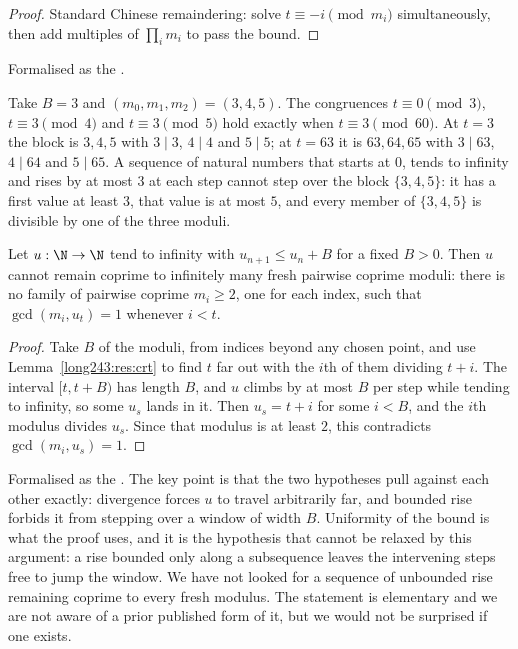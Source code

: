 \begin{proof}
Standard Chinese remaindering: solve $t\equiv-i \pmod{m_i}$ simultaneously,
then add multiples of $\prod_i m_i$ to pass the bound.
\end{proof}

\noindent Formalised as the
.

\begin{example}\label{long243:ex:crt}
Take $B=3$ and $(m_0,m_1,m_2)=(3,4,5)$.  The congruences $t\equiv0\pmod3$,
$t\equiv3\pmod4$ and $t\equiv3\pmod5$ hold exactly when $t\equiv3\pmod{60}$.
At $t=3$ the block is $3,4,5$ with $3\mid3$, $4\mid4$ and $5\mid5$; at $t=63$
it is $63,64,65$ with $3\mid63$, $4\mid64$ and $5\mid65$.  A sequence of
natural numbers that starts at $0$, tends to infinity and rises by at most $3$
at each step cannot step over the block $\{3,4,5\}$: it has a first value at
least $3$, that value is at most $5$, and every member of $\{3,4,5\}$ is
divisible by one of the three moduli.
\end{example}

\begin{theorem}\label{long243:res:barrier}
Let $u:\N\to\N$ tend to infinity with $u_{n+1}\le u_n+B$ for a fixed $B>0$.
Then $u$ cannot remain coprime to infinitely many fresh pairwise coprime
moduli: there is no family of pairwise coprime $m_i\ge2$, one for each index,
such that $\gcd(m_i,u_t)=1$ whenever $i<t$.
\end{theorem}

\begin{proof}
Take $B$ of the moduli, from indices beyond any chosen point, and use
Lemma~\ref{long243:res:crt} to find $t$ far out with the $i$th of them dividing $t+i$.
The interval $[t,t+B)$ has length $B$, and $u$ climbs by at most $B$ per step
while tending to infinity, so some $u_s$ lands in it.  Then $u_s=t+i$ for some
$i<B$, and the $i$th modulus divides $u_s$.  Since that modulus is at least
$2$, this contradicts $\gcd(m_i,u_s)=1$.
\end{proof}

\noindent Formalised as the
.  The key point is that the two hypotheses pull against each other
exactly: divergence forces $u$ to travel arbitrarily far, and bounded rise
forbids it from stepping over a window of width $B$.  Uniformity of the bound
is what the proof uses, and it is the hypothesis that cannot be relaxed by this
argument: a rise bounded only along a subsequence leaves the intervening steps
free to jump the window.  We have not looked for a sequence of unbounded rise
remaining coprime to every fresh modulus.  The statement is elementary and we are not aware of a
prior published form of it, but we would not be surprised if one exists.

